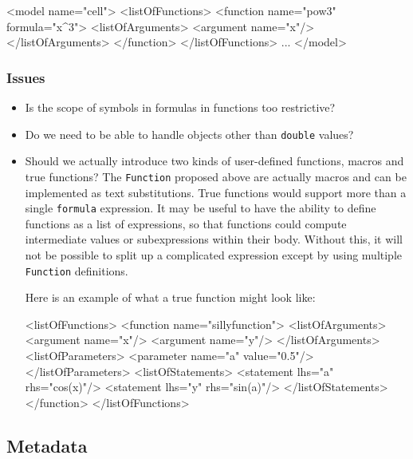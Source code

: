 \documentclass[10pt]{cekarticle}
\begin{document}
\begin{example}
<model name="cell">
    <listOfFunctions>
        <function name="pow3" formula="x^3">
            <listOfArguments>
                <argument name="x"/>
            </listOfArguments>
        </function>
    </listOfFunctions>
    ...
</model>
\end{example}

\subsubsection{Issues}
\label{sec:function-issues}

\begin{itemize}

\item Is the scope of symbols in formulas in functions too restrictive?
  
\item Do we need to be able to handle objects other than \texttt{double}
  values?
  
\item Should we actually introduce two kinds of user-defined functions,
  macros and true functions?  The \texttt{Function} proposed above are
  actually macros and can be implemented as text substitutions.  True
  functions would support more than a single \texttt{formula} expression.
  It may be useful to have the ability to define functions as a list of
  expressions, so that functions could compute intermediate values or
  subexpressions within their body.  Without this, it will not be possible
  to split up a complicated expression except by using multiple
  \texttt{Function} definitions.

  Here is an example of what a true function might look like:
\begin{example}
<listOfFunctions>
  <function name="sillyfunction">
    <listOfArguments>
      <argument name="x"/>
      <argument name="y"/>
    </listOfArguments>    
    <listOfParameters>
      <parameter name="a" value="0.5"/>
    </listOfParameters>
    <listOfStatements>
      <statement lhs="a" rhs="cos(x)"/>
      <statement lhs="y" rhs="sin(a)"/>
    </listOfStatements>
  </function>
</listOfFunctions>
\end{example}

\end{itemize}


\subsection{Metadata}
\label{sec:metadata}
\end{document}
